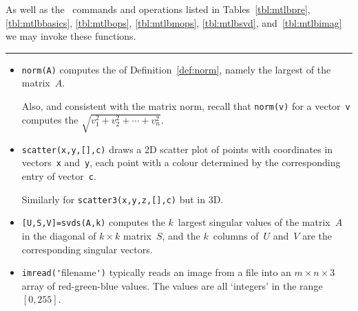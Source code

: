 \begin{table}
\caption{As well as the \script\ commands and operations listed in Tables~\ref{tbl:mtlbpre}, \ref{tbl:mtlbbasics}, \ref{tbl:mtlbops}, \ref{tbl:mtlbmops}, \ref{tbl:mtlbsvd}, and~\ref{tbl:mtlbimag}  we may invoke these functions.} \label{tbl:mtlbnorm}
\hrule
\begin{minipage}{\linewidth}
\begin{itemize}
\item {}\verb|norm(A)| computes the  of Definition~\ref{def:norm}, namely the largest  of the matrix~\(A\).

Also, and consistent with the matrix norm, recall that \verb|norm(v)| for a vector~\verb|v| computes the  \(\sqrt{v_1^2+v_2^2+\cdots+v_n^2}\).



\item {}\verb|scatter(x,y,[],c)| draws a 2D scatter plot of points with coordinates in vectors~\verb|x| and~\verb|y|, each point with a colour determined by the corresponding entry of vector~\verb|c|.  

Similarly for \verb|scatter3(x,y,z,[],c)| but in 3D.

\item {}\verb|[U,S,V]=svds(A,k)| computes the \(k\)~largest singular values of the matrix~\(A\) in the diagonal of \(k\times k\) matrix~\(S\), and the  \(k\)~columns of~\(U\) and~\(V\) are the corresponding singular vectors.


\item  {}\verb|imread('|filename\verb|')| typically reads an image from a file into an \(m\times n\times 3\) array of red-green-blue values. 
The values are all `integers' in the range~\([0,255]\).


\end{itemize}
\end{minipage}
\end{table}
